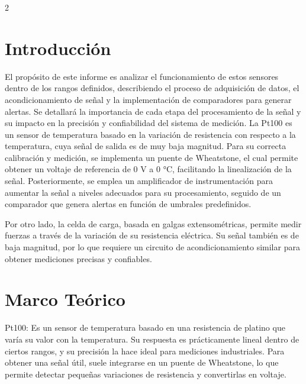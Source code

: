 \documentclass{article}
\begin{document}
\begin{multicols}{2}

\section{Introducción}
El propósito de este informe es analizar el funcionamiento de estos sensores dentro de los rangos definidos, describiendo el proceso de adquisición de datos, el acondicionamiento de señal y la implementación de comparadores para generar alertas. Se detallará la importancia de cada etapa del procesamiento de la señal y su impacto en la precisión y confiabilidad del sistema de medición. La Pt100 es un sensor de temperatura basado en la variación de resistencia con respecto a la temperatura, cuya señal de salida es de muy baja magnitud. Para su correcta calibración y medición, se implementa un puente de Wheatstone, el cual permite obtener un voltaje de referencia de 0 V a 0 °C, facilitando la linealización de la señal. Posteriormente, se emplea un amplificador de instrumentación para aumentar la señal a niveles adecuados para su procesamiento, seguido de un comparador que genera alertas en función de umbrales predefinidos.

Por otro lado, la celda de carga, basada en galgas extensométricas, permite medir fuerzas a través de la variación de su resistencia eléctrica. Su señal también es de baja magnitud, por lo que requiere un circuito de acondicionamiento similar para obtener mediciones precisas y confiables.



\section{Marco Teórico}
Pt100: Es un sensor de temperatura basado en una resistencia de platino que varía su valor con la temperatura. Su respuesta es prácticamente lineal dentro de ciertos rangos, y su precisión la hace ideal para mediciones industriales. Para obtener una señal útil, suele integrarse en un puente de Wheatstone, lo que permite detectar pequeñas variaciones de resistencia y convertirlas en voltaje.

\vspace{0.2cm}


\end{multicols}
\end{document}
